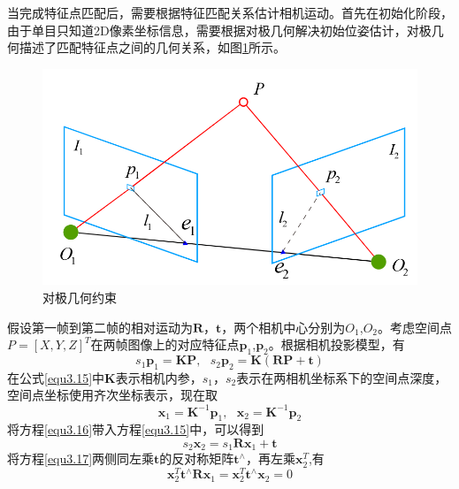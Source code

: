 当完成特征点匹配后，需要根据特征匹配关系估计相机运动。首先在初始化阶段，由于单目只知道2D像素坐标信息，需要根据对极几何解决初始位姿估计，对极几何描述了匹配特征点之间的几何关系，如图\ref{fig3.7}所示。
\begin{figure}[h]
\centering
\includegraphics[scale=0.5]{figures/Fig3.7.png}
\caption{对极几何约束}
\label{fig3.7}
\end{figure}
假设第一帧到第二帧的相对运动为$\boldsymbol{R}$，$\boldsymbol{t}$，两个相机中心分别为$O_1$,$O_2$。考虑空间点$P=[X,Y,Z]^T$在两帧图像上的对应特征点$\boldsymbol{p}_1$,$\boldsymbol{p}_2$。根据相机投影模型，有
\begin{equation}
\label{equ3.15}
s_1 \boldsymbol{p}_1 = \boldsymbol{K} \boldsymbol{P}, \ \ \ 
s_2 \boldsymbol{p}_2 = \boldsymbol{K} (\boldsymbol{R} \boldsymbol{P}+\boldsymbol{t})
\end{equation}
在公式\eqref{equ3.15}中$\boldsymbol{K}$表示相机内参，$s_1$，$s_2$表示在两相机坐标系下的空间点深度，空间点坐标使用齐次坐标表示，现在取
\begin{equation}
\label{equ3.16}
\boldsymbol{x}_1 = \boldsymbol{K}^{-1} \boldsymbol{p}_1, \ \ \ 
\boldsymbol{x}_2 = \boldsymbol{K}^{-1} \boldsymbol{p}_2
\end{equation}
将方程\eqref{equ3.16}带入方程\eqref{equ3.15}中，可以得到
\begin{equation}
\label{equ3.17}
s_2 \boldsymbol{x}_2 = s_1 \boldsymbol{R} \boldsymbol{x}_1 + \boldsymbol{t}
\end{equation}
将方程\eqref{equ3.17}两侧同左乘$\boldsymbol{t}$的反对称矩阵$\boldsymbol{t}^{\wedge}$，再左乘$\boldsymbol{x}_2^T$,有
\begin{equation}
\label{equ3.18}
\boldsymbol{x}_2^T  \boldsymbol{t}^{\wedge}  \boldsymbol{R} \boldsymbol{x}_1 = \boldsymbol{x}_2^T \boldsymbol{t}^{\wedge} \boldsymbol{x}_2 = 0
\end{equation}
